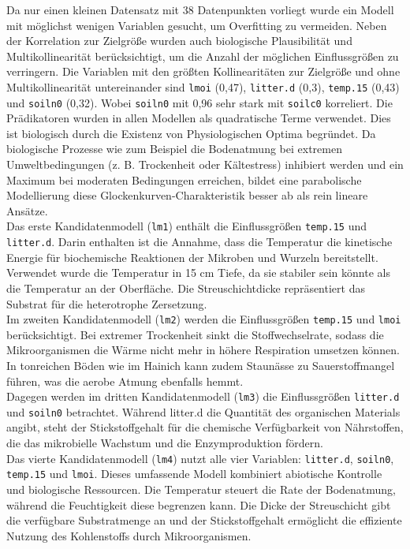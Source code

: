 Da nur einen kleinen Datensatz mit 38 Datenpunkten vorliegt wurde ein Modell mit möglichst wenigen
Variablen gesucht, um Overfitting zu vermeiden. Neben der Korrelation zur Zielgröße wurden auch biologische
Plausibilität und Multikollinearität berücksichtigt, um die Anzahl der möglichen Einflussgrößen zu
verringern. Die Variablen mit den größten Kollinearitäten zur Zielgröße und ohne Multikollinearität
untereinander sind \texttt{lmoi} (0,47), \texttt{litter.d} (0,3), \texttt{temp.15} (0,43) und
\texttt{soiln0} (0,32). Wobei \texttt{soiln0} mit 0,96 sehr stark mit \texttt{soilc0} korreliert.
Die Prädikatoren wurden in allen Modellen als quadratische Terme verwendet. Dies ist biologisch durch die
Existenz von Physiologischen Optima begründet. Da biologische Prozesse wie zum Beispiel die Bodenatmung bei
extremen Umweltbedingungen (z. B. Trockenheit oder Kältestress) inhibiert werden und ein Maximum bei moderaten
Bedingungen erreichen, bildet eine parabolische Modellierung diese Glockenkurven-Charakteristik besser ab als
rein lineare Ansätze.
\\
Das erste Kandidatenmodell (\texttt{lm1}) enthält die Einflussgrößen \texttt{temp.15} und \texttt{litter.d}. Darin enthalten ist
die Annahme, dass die Temperatur die kinetische Energie für biochemische Reaktionen der Mikroben und Wurzeln
bereitstellt. Verwendet wurde die Temperatur in 15 cm Tiefe, da sie stabiler sein könnte als die Temperatur an der Oberfläche. Die Streuschichtdicke repräsentiert das Substrat für die heterotrophe Zersetzung.
\\
Im zweiten Kandidatenmodell (\texttt{lm2}) werden die Einflussgrößen \texttt{temp.15} und \texttt{lmoi} berücksichtigt.
Bei extremer Trockenheit sinkt die Stoffwechselrate, sodass die Mikroorganismen die Wärme nicht mehr in
höhere Respiration umsetzen können. In tonreichen Böden wie im Hainich kann zudem Staunässe zu
Sauerstoffmangel führen, was die aerobe Atmung ebenfalls hemmt.
\\
Dagegen werden im dritten Kandidatenmodell (\texttt{lm3}) die Einflussgrößen \texttt{litter.d} und \texttt{soiln0} betrachtet.
Während litter.d die Quantität des organischen Materials angibt, steht der Stickstoffgehalt für die
chemische Verfügbarkeit von Nährstoffen, die das mikrobielle Wachstum und die Enzymproduktion fördern. \cite{diss}
\\
Das vierte Kandidatenmodell (\texttt{lm4}) nutzt alle vier Variablen: \texttt{litter.d}, \texttt{soiln0}, \texttt{temp.15} und \texttt{lmoi}.
Dieses umfassende Modell kombiniert abiotische Kontrolle und biologische Ressourcen. Die Temperatur steuert
die Rate der Bodenatmung, während die Feuchtigkeit diese begrenzen kann. Die Dicke der Streuschicht gibt die verfügbare Substratmenge
an und der Stickstoffgehalt ermöglicht die effiziente Nutzung des Kohlenstoffs durch Mikroorganismen.

